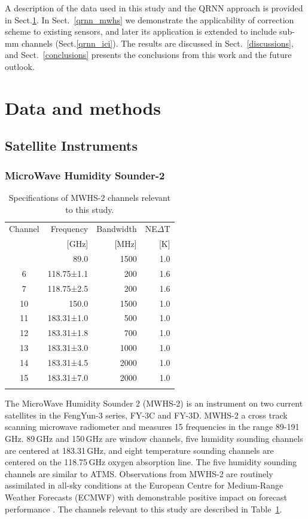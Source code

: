 \documentclass[amt, manuscript]{copernicus}
\begin{document}
A description of the data used in this study and the QRNN approach is provided
in Sect.\ref{data_methods}. In Sect.~\ref{qrnn_mwhs} we demonstrate the
applicability of correction scheme to existing sensors, and later its
application is extended to include sub-mm channels (Sect.\ref{qrnn_ici}). The
results are discussed in Sect.~\ref{discussions}, and Sect.~\ref{conclusions}
presents the conclusions from this work and the future outlook.


\section{Data and methods}
\label{data_methods}
%
\subsection{Satellite Instruments}
%
\subsubsection{ MicroWave Humidity Sounder-2}
%
\begin{table}[t]
	\caption{Specifications of MWHS-2 channels relevant to this study.}
	\label{tab:specifications_MWHS2}	
	\begin{tabular}{crrr}
		\tophline
		Channel & Frequency 	& Bandwidth & NE$\Delta$T \\
		& [GHz]			& [MHz]		& [K]		\\
		\middlehline
		1	&	89.0   		  & 1500			&	1.0	\\
		6	&	118.75±1.1    & \phantom{0}200 	&	1.6\\
		7	&	118.75±2.5    & \phantom{0}200 	&	1.6\\
		10	&	150.0         & 1500 			&	1.0 \\
		11	&	183.31±1.0      & \phantom{0}500  &	1.0 \\
		12  & 	183.31±1.8    & \phantom{0}700 	&   1.0\\
		13  & 	183.31±3.0      & 1000    		&	1.0	\\
		14  & 	183.31±4.5    & 2000    		&	1.0\\
		15  & 	183.31±7.0      & 2000  			&	1.0  \\
		\bottomhline
	\end{tabular}
	\belowtable{} %
\end{table}
The MicroWave Humidity Sounder 2 (MWHS-2) is an instrument on two current satellites in the FengYun-3 series, FY-3C and FY-3D. MWHS-2 a cross track scanning microwave radiometer and measures 15 frequencies in the range 89-191\,GHz. 89\,GHz and 150\,GHz are window channels, five humidity sounding channels are centered at 183.31\,GHz, and eight temperature sounding channels are centered on the 118.75\,GHz oxygen absorption line. The five humidity sounding channels are similar to ATMS. Observations from MWHS-2 are routinely assimilated in all-sky conditions at the European Centre for Medium-Range Weather Forecasts (ECMWF) with demonstrable positive impact on forecast performance \citep{duncan2020MWHS}. The channels relevant to this study are described in Table~\ref{tab:specifications_MWHS2}. 
\end{document}
